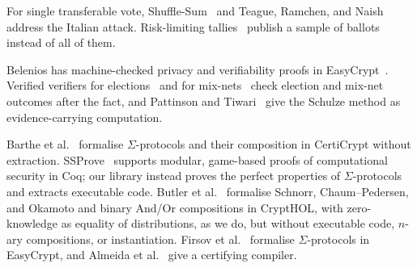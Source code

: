 For single transferable vote, Shuffle-Sum~\cite{shufflesum2009} and
Teague, Ramchen, and Naish~\cite{teague2008stv} address the Italian
attack. Risk-limiting tallies~\cite{jamroga2019rlt} publish a sample of
ballots instead of all of them.

Belenios has machine-checked privacy and verifiability proofs in
EasyCrypt~\cite{cortier2018belenios}. Verified verifiers for
elections~\cite{10.1145/3319535.3354247} and for mix-nets~\cite{9519460,287095}
check election and mix-net outcomes after the fact, and Pattinson
and Tiwari~\cite{10.1007/978-3-319-66107-0_26} give the Schulze method
as evidence-carrying computation. 

Barthe et al.~\cite{5552642} formalise $\Sigma$-protocols and their
composition in CertiCrypt without extraction. SSProve~\cite{abate2021ssprove}
supports modular, game-based proofs of computational security in Coq;
our library instead proves the perfect properties of $\Sigma$-protocols
and extracts executable code. Butler et
al.~\cite{butler2021formalising} formalise Schnorr, Chaum--Pedersen, and
Okamoto and binary And/Or compositions in CryptHOL, with zero-knowledge as
equality of distributions, as we do, but without executable code, $n$-ary
compositions, or instantiation. Firsov et al.~\cite{10221929} formalise
$\Sigma$-protocols in EasyCrypt, and Almeida et
al.~\cite{almeida2010certifying} give a certifying compiler.
